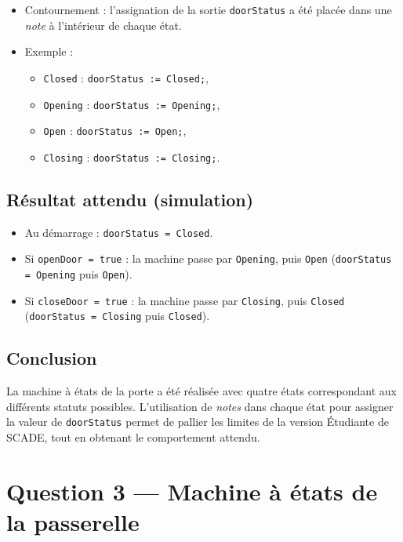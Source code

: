 \documentclass[11pt,a4paper]{report}
\begin{document}
\begin{enumerate}
\begin{itemize}
    \item Contournement : l’assignation de la sortie \texttt{doorStatus} a été placée dans une \textit{note} à l’intérieur de chaque état.
    \item Exemple :
      \begin{itemize}
        \item \texttt{Closed} : \texttt{doorStatus := Closed;},
        \item \texttt{Opening} : \texttt{doorStatus := Opening;},
        \item \texttt{Open} : \texttt{doorStatus := Open;},
        \item \texttt{Closing} : \texttt{doorStatus := Closing;}.
      \end{itemize}
  \end{itemize}
\end{enumerate}

\section*{Résultat attendu (simulation)}
\begin{itemize}
  \item Au démarrage : \texttt{doorStatus = Closed}.
  \item Si \texttt{openDoor = true} : la machine passe par \texttt{Opening}, puis \texttt{Open} (\texttt{doorStatus = Opening} puis \texttt{Open}).
  \item Si \texttt{closeDoor = true} : la machine passe par \texttt{Closing}, puis \texttt{Closed} (\texttt{doorStatus = Closing} puis \texttt{Closed}).
\end{itemize}

\section*{Conclusion}
La machine à états de la porte a été réalisée avec quatre états correspondant aux différents statuts possibles.  
L’utilisation de \textit{notes} dans chaque état pour assigner la valeur de \texttt{doorStatus} permet de pallier les limites de la version Étudiante de SCADE, tout en obtenant le comportement attendu.

\chapter{Question 3 — Machine à états de la passerelle}
\end{document}
